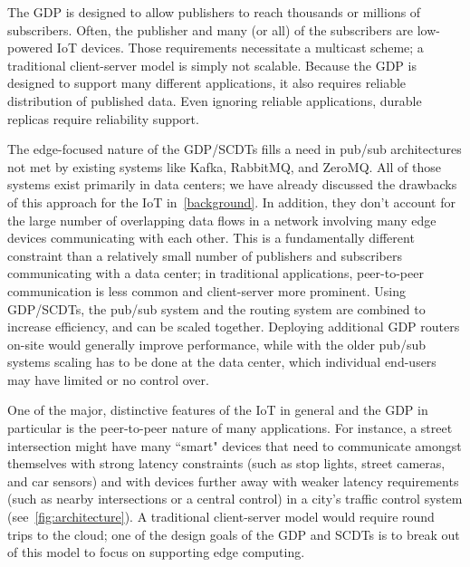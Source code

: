 The GDP is designed to allow publishers to reach thousands or millions of subscribers. Often, the publisher and many (or all) of the subscribers are low-powered IoT devices. Those requirements necessitate a multicast scheme; a traditional client-server model is simply not scalable. Because the GDP is designed to support many different applications, it also requires reliable distribution of published data. Even ignoring reliable applications, durable replicas require reliability support.

The edge-focused nature of the GDP/SCDTs fills a need in pub/sub architectures not met by existing systems like Kafka, RabbitMQ, and ZeroMQ. All of those systems exist primarily in data centers; we have already discussed the drawbacks of this approach for the IoT in~\autoref{background}. In addition, they don't account for the large number of overlapping data flows in a network involving many edge devices communicating with each other. This is a fundamentally different constraint than a relatively small number of publishers and subscribers communicating with a data center; in traditional applications, peer-to-peer communication is less common and client-server more prominent. Using GDP/SCDTs, the pub/sub system and the routing system are combined to increase efficiency, and can be scaled together. Deploying additional GDP routers on-site would generally improve performance, while with the older pub/sub systems scaling has to be done at the data center, which individual end-users may have limited or no control over. 

One of the major, distinctive features of the IoT in general and the GDP in particular is the peer-to-peer nature of many applications. For instance, a street intersection might have many ``smart" devices that need to communicate amongst themselves with strong latency constraints (such as stop lights, street cameras, and car sensors) and with devices further away with weaker latency requirements (such as nearby intersections or a central control) in a city's traffic control system (see~\autoref{fig:architecture}). A traditional client-server model would require round trips to the cloud; one of the design goals of the GDP and SCDTs is to break out of this model to focus on supporting edge computing.


